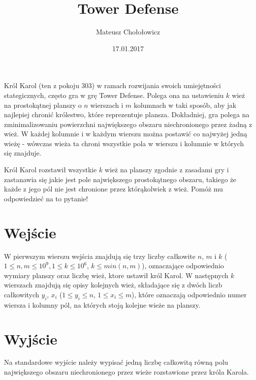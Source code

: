 \documentclass[zad,zawodnik,utf8]{sinol}
\title{Tower Defense}
\author{Mateusz Chołołowicz} %
\date{17.01.2017}
\begin{document}
\begin{tasktext}%
Król Karol (ten z pokoju 303) w ramach rozwijania swoich umiejętności stategicznych, często gra w grę Tower Defense. 
Polega ona na ustawieniu $k$ wież na prostokątnej planszy o $n$ wierszach i $m$ kolumnach w taki sposób, aby jak najlepiej chronić
królestwo, które reprezentuje plansza. Dokładniej, gra polega na zminimalizowaniu powierzchni największego obszaru niechronionego przez żadną z wież.
W każdej kolumnie i w każdym wierszu można postawić co najwyżej jedną wieżę - wówczas wieża ta chroni wszystkie pola w wierszu 
i kolumnie w których się znajduje. 

Król Karol rozstawił wszystkie $k$ wież na planszy zgodnie z zasadami gry i zastanawia się jakie jest pole największego prostokątnego obszaru, takiego
że każde z jego pól nie jest chronione przez którąkolwiek z wież. Pomóż mu odpowiedzieć na to pytanie!

  \section{Wejście}
W pierwszym wierszu wejścia znajdują się trzy liczby całkowite $n$, $m$ i $k$ ($1 \leq n, m \leq 10^9, 1 \leq k \leq 10^6$, $k \leq min(n, m)$), 
oznaczające odpowiednio wymiary planszy oraz liczbę wież, ktore ustawił król Karol. W następnych $k$ wierszach znajdują się opisy
kolejnych wież, składające się z dwóch liczb całkowitych $y_i$, $x_i$ ($1 \leq y_i \leq n$, $1 \leq x_i \leq m$), które oznaczają odpowiednio
numer wiersza i kolumny pól, na których stoją kolejne wieże na planszy.
 \section{Wyjście}
Na standardowe wyjście należy wypisać jedną liczbę całkowitą równą polu największego obszaru niechronionego przez wieże rozstawione
przez króla Karola.

\makecompactexample

\end{tasktext}
\end{document}
